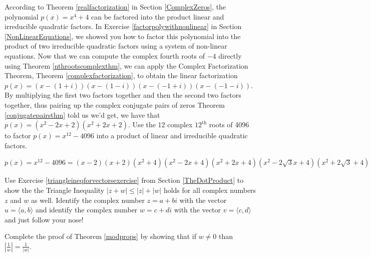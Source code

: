 \documentclass{ximera}
\begin{document}
\begin{problem}
According to Theorem \ref{realfactorization} in Section \ref{ComplexZeros}, the polynomial $p(x) = x^{4} + 4$ can be factored into the product linear and irreducible quadratic factors.  In Exercise \ref{factorpolywithnonlinear} in Section \ref{NonLinearEquations}, we showed you how to factor this polynomial into the product of two irreducible quadratic factors using a system of non-linear equations.  Now that we can compute the complex fourth roots of $-4$ directly using  Theorem \ref{nthrootscomplexthm}, we can  apply the Complex Factorization Theorem, Theorem \ref{complexfactorization}, to obtain the linear factorization $p(x) = (x - (1 + i))(x - (1 - i))(x - (-1 + i))(x - (-1 - i))$.  By multiplying the first two factors together and then the second two factors together, thus pairing up the complex conjugate pairs of zeros Theorem \ref{conjugatepairsthm} told us we'd get, we have that $p(x) = (x^{2} - 2x + 2)(x^{2} + 2x + 2)$.  Use the 12 complex $12^{\text{th}}$ roots of 4096 to factor $p(x) = x^{12} - 4096$ into a product of linear and irreducible quadratic factors.

\begin{solution}
$p(x) = x^{12} - 4096 = (x - 2)(x + 2)(x^{2} + 4)(x^{2} - 2x + 4)(x^{2} + 2x + 4)(x^{2} - 2\sqrt{3}x + 4)(x^{2} + 2\sqrt{3} + 4)$
\end{solution}
\end{problem}


\begin{problem}
Use Exercise \ref{triangleineqforvectorsexercise} from Section \ref{TheDotProduct} to show the the Triangle Inequality $|z + w| \leq |z| + |w|$ holds for all complex numbers $z$ and $w$ as well.  Identify the complex number $z = a + bi$ with the vector $u = \langle a, b \rangle$ and identify the complex number $w = c + di$ with the vector $v = \langle c, d \rangle$ and just follow your nose!
\end{problem}


\begin{problem}
Complete the proof of Theorem \ref{modprops} by showing that if $w \neq 0$ than  $\left| \frac{1}{w}\right| = \frac{1}{|w|}$.
\end{problem}
\end{document}
